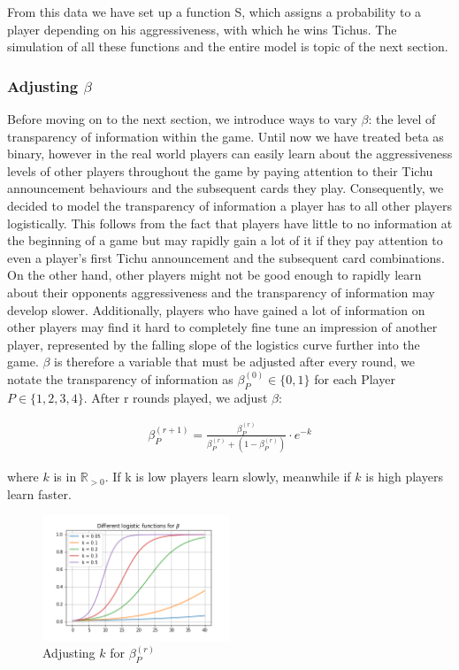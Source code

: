 From this data we have set up a function S, which assigns a probability to a player depending on his aggressiveness, with which he wins Tichus. The simulation of all these functions and the entire model is topic  of the next section.

\subsubsection{Adjusting $\beta$}

Before moving on to the next section, we introduce ways to vary $\beta$: the level of transparency of information within the game. Until now we have treated beta as binary, however in the real world players can easily learn about the aggressiveness levels of other players throughout the game by paying attention to their Tichu announcement behaviours and the subsequent cards they play. Consequently, we decided to model the transparency of information a player has to all other players logistically. This follows from the fact that players have little to no information at the beginning of a game but may rapidly gain a lot of it if they pay attention to even a player’s first Tichu announcement and the subsequent card combinations. On the other hand, other players might not be good enough to rapidly learn about their opponents aggressiveness and the transparency of information may develop slower. Additionally, players who have gained a lot of information on other players may find it hard to completely fine tune an impression of another player, represented by the falling slope of the logistics curve further into the game. $\beta$ is therefore a variable that must be adjusted after every round, we notate the transparency of information as $\beta^{(0)}_{P}\in\{0,1\}$ for each Player $P\in\{1,2,3,4\}$. After r rounds played, we adjust $\beta$:

\begin{align*}
\beta^{(r+1)}_{P} = \frac{\beta^{(r)}_{P}
}{\beta^{(r)}_{P} + (1 - \beta^{(r)}_{P})} \cdot e^{-k}
\end{align*}

where $k$ is in $\mathbb{R}_{>0}$. If k is low players learn slowly, meanwhile if $k$ is high players learn faster. 

\begin{figure}[h!]
    \centering
    \includegraphics[width=0.5\textwidth]{Bilder/5_log}
    \caption{Adjusting $k$ for $\beta^{(r)}_{P}$}
    \label{fig:14}
\end{figure}

